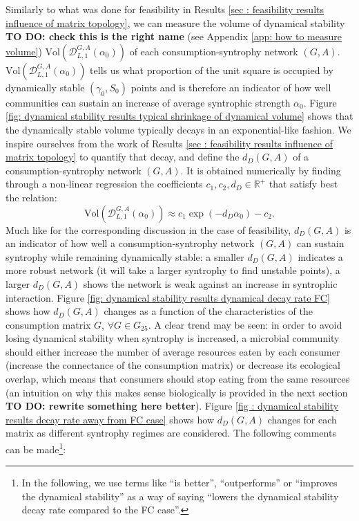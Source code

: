 \documentclass[12pt, titlepage]{report}
\begin{document}
Similarly to what was done for feasibility in Results \ref{sec : feasibility results influence of matrix topology}, we can measure the volume of dynamical stability \textbf{TO DO: check this is the right name} (see Appendix \ref{app: how to measure volume}) $\text{Vol}\left(\mathcal{D}_{L,1}^{G,A}(\alpha_0)\right)$ of each consumption-syntrophy network $(G,A)$. $\text{Vol}\left(\mathcal{D}_{L,1}^{G,A}(\alpha_0)\right)$ tells us what proportion of the unit square is occupied by dynamically stable $(\gamma_0, S_0)$ points and is therefore an indicator of how well communities can sustain an increase of average syntrophic strength $\alpha_0$.
Figure \ref{fig: dynamical stability results typical shrinkage of dynamical volume} shows that the dynamically stable volume typically decays in an exponential-like fashion. We inspire ourselves from the work of Results \ref{sec : feasibility results influence of matrix topology} to quantify that decay, and define the  $d_D(G,A)$ of a consumption-syntrophy network $(G,A)$. It is obtained numerically by finding through a non-linear regression the coefficients $c_1, c_2, d_D \in \mathbb{R}^+$ that satisfy best the relation:
\begin{equation}
\text{Vol}\left(\mathcal{D}_{L,1}^{G,A}(\alpha_0)\right) \approx c_1 \exp\left(-d_D \alpha_0\right)-c_2.
\end{equation}
Much like for the corresponding discussion in the case of feasibility, $d_D(G,A)$ is an indicator of how well a consumption-syntrophy network $(G,A)$ can sustain syntrophy while remaining dynamically stable: a smaller $d_D(G,A)$ indicates a more robust network (it will take a larger syntrophy to find unstable points), a larger $d_D(G,A)$ shows the network is weak against an increase in syntrophic interaction. Figure \ref{fig: dynamical stability results dynamical decay rate FC} shows how $d_D(G,A)$ changes as a function of the characteristics of the consumption matrix $G$, $\forall G \in G_{25}$. A clear trend may be seen: in order to avoid losing dynamical stability when syntrophy is increased, a microbial community should either increase the number of average resources eaten by each consumer (\ie increase the connectance of the consumption matrix) or decrease its ecological overlap, which means that consumers should stop eating from the same resources (an intuition on why this makes sense biologically is provided in the next section \textbf{TO DO: rewrite something here better}). Figure \ref{fig : dynamical stability results decay rate away from FC case} shows how $d_D(G,A)$ changes for each matrix as different syntrophy regimes are considered. The following comments can be made\footnote{In the following, we use terms like ``is better'', ``outperforms'' or ``improves the dynamical stability'' as a way of saying ``lowers the dynamical stability decay rate compared to the FC case''.}:
\end{document}
